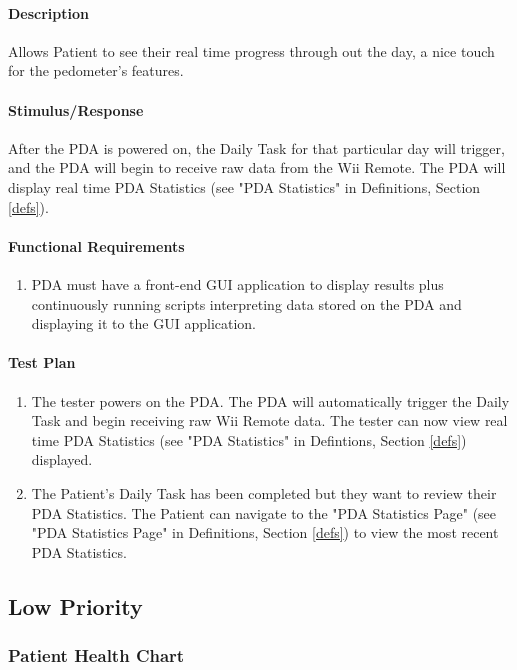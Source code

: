 \documentclass{article}
\begin{document}
\paragraph{Description}
Allows Patient to see their real time progress through out the day, a nice touch for the pedometer's features.

\paragraph{Stimulus/Response}
After the PDA is powered on, the Daily Task for that particular day will trigger, and the PDA will begin to receive raw data from the Wii Remote. The PDA will display real time PDA Statistics (see "PDA Statistics" in Definitions, Section \ref{defs}).

\paragraph{Functional Requirements}
\begin {enumerate}
\item PDA must have a front-end GUI application to display results plus continuously running scripts interpreting data stored on the PDA and displaying it to the GUI application.
\end{enumerate}

\paragraph{Test Plan}
\begin{enumerate}
\item The tester powers on the PDA. The PDA will automatically trigger the Daily Task and begin receiving raw Wii Remote data. The tester can now view real time PDA Statistics (see "PDA Statistics" in Defintions, Section \ref{defs}) displayed.
\item The Patient's Daily Task has been completed but they want to review their PDA Statistics. The Patient can navigate to the "PDA Statistics Page" (see "PDA Statistics Page" in Definitions, Section \ref{defs}) to view the most recent PDA Statistics.
\end{enumerate}

\subsection{Low Priority}

\subsubsection{Patient Health Chart}\label{sec: Health Chart}
\end{document}
